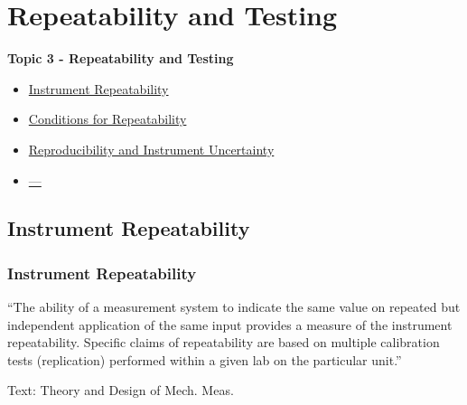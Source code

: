 \documentclass[fleqn]{beamer} %
\newcommand{\sectionIIItitle}{Repeatability and Testing}
\newcommand{\sectionIIIsubsectionItitle}{Instrument Repeatability}
\newcommand{\sectionIIIsubsectionIItitle}{Conditions for Repeatability}
\newcommand{\sectionIIIsubsectionIIItitle}{Reproducibility and Instrument Uncertainty}
\newcommand{\sectionIIIsubsectionIVtitle}{---}
\begin{document}
			\begin{frame}

			


			\end{frame}


		
	\section{\sectionIIItitle}\label{sectionIII}

		\begin{frame}
			\large \textbf{Topic 3 - \sectionIIItitle} \vspace{3mm}\\

			\begin{itemize}
				\item \hyperlink{sectionIIIsubsectionI}{\sectionIIIsubsectionItitle} \vspc %
				\item \hyperlink{sectionIIIsubsectionII}{\sectionIIIsubsectionIItitle} \vspc %
				\item \hyperlink{sectionIIIsubsectionIII}{\sectionIIIsubsectionIIItitle} \vspc %
				\item \hyperlink{sectionIIIsubsectionIV}{\sectionIIIsubsectionIVtitle} \vspc %
			\end{itemize}

		\end{frame}

		\subsection{\sectionIIIsubsectionItitle}\label{sectionIIIsubsectionI}

			\begin{frame}
				\frametitle{\sectionIIIsubsectionItitle}

				
				``The ability of a measurement system to indicate the same value on repeated but independent
				application of the same input provides a measure of the instrument {\PN repeatability}. Specific claims of
				{\PN repeatability} are based on multiple calibration tests (replication) performed within a given lab on the
				particular unit.'' \vspc

				\begin{framed}\hspace{10mm}\end{framed}

				\vspace{10mm}

				{\tiny Text: Theory and Design of Mech. Meas.}
				
			\end{frame}
\end{document}
